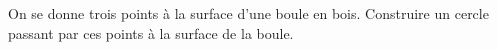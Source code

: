 On se donne trois points à la surface d'une boule en bois. Construire un cercle passant par ces points à la surface de la boule.
